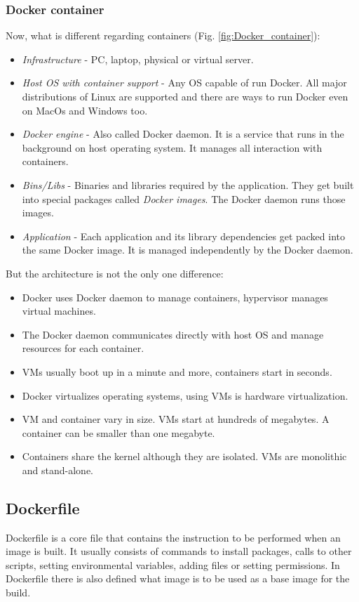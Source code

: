\subsubsection{Docker container}
\noindent
Now, what is different regarding containers (Fig. \ref{fig:Docker_container}):
\begin{itemize}
\item \textit{Infrastructure} - PC, laptop, physical or virtual server.
\item \textit{Host OS with container support} - Any OS capable of run Docker. All major distributions of Linux are supported and there are ways
to run Docker even on MacOs and Windows too.
\item \textit{Docker engine} - Also called Docker daemon. It is a service that runs in the background on host operating system. It manages all interaction with containers.
\item \textit{Bins/Libs} - Binaries and libraries required by the application. They get built into special packages called \textit{Docker images}.
The Docker daemon runs those images.
\item \textit{Application} - Each application and its library dependencies get packed into the same Docker image. It is managed independently by the Docker daemon. 
\end{itemize}

\noindent
But the architecture is not the only one difference:
\begin{itemize}
\item Docker uses Docker daemon to manage containers, hypervisor manages virtual machines.
\item The Docker daemon communicates directly with host OS and manage resources for each container.
\item VMs usually boot up in a minute and more, containers start in seconds.
\item Docker virtualizes operating systems, using VMs is hardware virtualization.
\item VM and container vary in size. VMs start at hundreds of megabytes. A container can be smaller than one megabyte.
\item Containers share the kernel although they are isolated. VMs are monolithic and stand-alone.
\end{itemize}

\subsection{Dockerfile}
Dockerfile is a core file that contains the instruction to be performed when an image is built. It usually consists of commands to install packages, calls to other scripts, setting environmental variables, adding files or setting permissions. In Dockerfile there is also defined what image is to be used as a base image for the build.

